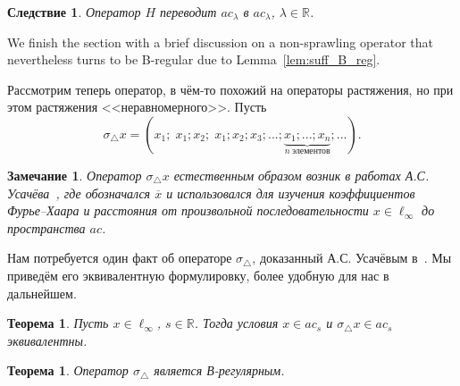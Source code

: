 \documentclass[a4paper,14pt]{article} %
\newcommand{\R}{\ensuremath{\mathbb{R}}}
\theoremstyle{plain}
\newtheorem{theorem}[lemma]{Теорема}
\newtheorem{remark}[lemma]{Замечание}
\newtheorem{corollary}{Следствие}[lemma]
\begin{document}

	\begin{corollary}
		Оператор $H$ переводит $ac_\lambda$ в $ac_\lambda$, $\lambda \in \mathbb R$.
	\end{corollary}


	We finish the section with a brief discussion on a non-sprawling operator
	that nevertheless turns to be B-regular due to Lemma~\ref{lem:suff_B_reg}.

	Рассмотрим теперь оператор,
	в чём-то похожий на операторы растяжения,
	но при этом растяжения <<неравномерного>>.
	Пусть
	\begin{equation}
		\sigma_\triangle x =
		(x_1; \; x_1; x_2; \; x_1; x_2; x_3; ... ; \underbrace{x_1; ...; x_n}_{n~\mbox{элементов}}; ...)
		.
	\end{equation}

	\begin{remark}
		Оператор $\sigma_\triangle x$ естественным образом возник в работах А.С. Усачёва~\cite{usachev2009_phd_vsu},
		где обозначался $\overline{x}$ и
		использовался для изучения коэффициентов Фурье--Хаара
		и расстояния от произвольной последовательности $x\in\ell_\infty$
		до пространства $ac$.
	\end{remark}

	Нам потребуется один факт об операторе $\sigma_\triangle$,
	доказанный А.С. Усачёвым в~\cite[теорема 19]{usachev2009_phd_vsu}.
	Мы приведём его эквивалентную формулировку, более удобную для нас в дальнейшем.

	\begin{theorem}
		\label{thm:usachev_overline_x_ac_s}
		Пусть $x\in\ell_\infty$, $s\in\R$.
		Тогда условия $x\in ac_s$ и $\sigma_\triangle x \in ac_s$ эквивалентны.
	\end{theorem}

	\begin{theorem}
		Оператор $\sigma_\triangle$ является В-регулярным.
	\end{theorem}
\end{document}
